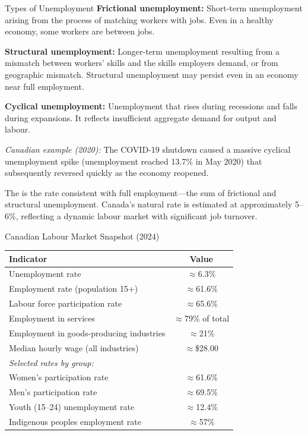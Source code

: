 \begin{defbox}{Types of Unemployment}
\textbf{Frictional unemployment:} Short-term unemployment arising from the process of matching workers with jobs. Even in a healthy economy, some workers are between jobs.

\textbf{Structural unemployment:} Longer-term unemployment resulting from a mismatch between workers' skills and the skills employers demand, or from geographic mismatch. Structural unemployment may persist even in an economy near full employment.

\textbf{Cyclical unemployment:} Unemployment that rises during recessions and falls during expansions. It reflects insufficient aggregate demand for output and labour.

\textit{Canadian example (2020):} The COVID-19 shutdown caused a massive cyclical unemployment spike (unemployment reached 13.7\% in May 2020) that subsequently reversed quickly as the economy reopened.
\end{defbox}

The  is the rate consistent with full employment---the sum of frictional and structural unemployment. Canada's natural rate is estimated at approximately 5--6\%, reflecting a dynamic labour market with significant job turnover.

\begin{databox}{Canadian Labour Market Snapshot (2024)}
\begin{center}
\begin{tabular}{lc}
\toprule
\textbf{Indicator} & \textbf{Value} \\
\midrule
Unemployment rate & $\approx$6.3\% \\
Employment rate (population 15+) & $\approx$61.6\% \\
Labour force participation rate & $\approx$65.6\% \\
Employment in services & $\approx$79\% of total \\
Employment in goods-producing industries & $\approx$21\% \\
Median hourly wage (all industries) & $\approx$\$28.00 \\
\midrule
\multicolumn{2}{l}{\textit{Selected rates by group:}} \\
Women's participation rate & $\approx$61.6\% \\
Men's participation rate & $\approx$69.5\% \\
Youth (15--24) unemployment rate & $\approx$12.4\% \\
Indigenous peoples employment rate & $\approx$57\% \\
\bottomrule
\end{tabular}
\end{center}
\end{databox}


